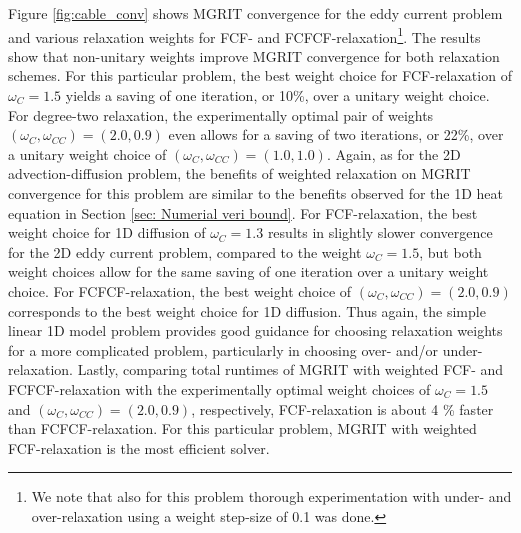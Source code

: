 \documentclass[VANCOUVER,STIX1COL]{WileyNJD-v2}
\begin{document}
Figure \ref{fig:cable_conv} shows MGRIT convergence for the eddy current problem and various relaxation weights for FCF- and FCFCF-relaxation\footnote{We note that also for this problem thorough experimentation with under- and over-relaxation using a weight step-size of 0.1 was done.}. The results show that non-unitary weights improve MGRIT convergence for both relaxation schemes. For this particular problem, the best weight choice for FCF-relaxation of $\omega_C = 1.5$ yields a saving of one iteration, or 10\%, over a unitary weight choice. For degree-two relaxation, the experimentally optimal pair of weights $(\omega_C, \omega_{CC}) = (2.0, 0.9)$ even allows for a saving of two iterations, or 22\%, over a unitary weight choice of $(\omega_C, \omega_{CC}) = (1.0, 1.0)$. Again, as for the 2D advection-diffusion problem, the benefits of weighted relaxation on MGRIT convergence for this problem are similar to the benefits observed for the 1D heat equation in Section \ref{sec: Numerial veri bound}. For FCF-relaxation, the best weight choice for 1D diffusion of $\omega_C = 1.3$ results in slightly slower convergence for the 2D eddy current problem, compared to the weight $\omega_C=1.5$, but both weight choices allow for the same saving of one iteration over a unitary weight choice. For FCFCF-relaxation, the best weight choice of $(\omega_C, \omega_{CC}) = (2.0, 0.9)$ corresponds to the best weight choice for 1D diffusion. Thus again, the simple linear 1D model problem provides good guidance for choosing relaxation weights for a more complicated problem, particularly in choosing over- and/or under-relaxation. 
Lastly, comparing total runtimes of MGRIT with weighted FCF- and FCFCF-relaxation with the experimentally optimal weight choices of $\omega_C=1.5$ and $(\omega_C, \omega_{CC}) = (2.0, 0.9)$, respectively, FCF-relaxation is about 4 \% faster than FCFCF-relaxation. For this particular problem, MGRIT with weighted FCF-relaxation is the most efficient solver.
\end{document}
